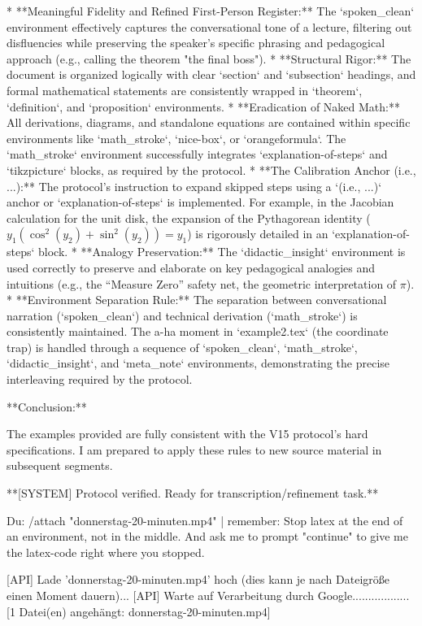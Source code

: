 *   **Meaningful Fidelity and Refined First-Person Register:** The `spoken_clean` environment effectively captures the conversational tone of a lecture, filtering out disfluencies while preserving the speaker's specific phrasing and pedagogical approach (e.g., calling the theorem "the final boss").
*   **Structural Rigor:** The document is organized logically with clear `section` and `subsection` headings, and formal mathematical statements are consistently wrapped in `theorem`, `definition`, and `proposition` environments.
*   **Eradication of Naked Math:** All derivations, diagrams, and standalone equations are contained within specific environments like `math_stroke`, `nice-box`, or `orangeformula`. The `math_stroke` environment successfully integrates `explanation-of-steps` and `tikzpicture` blocks, as required by the protocol.
*   **The Calibration Anchor (i.e., ...):** The protocol's instruction to expand skipped steps using a `(i.e., ...)` anchor or `explanation-of-steps` is implemented. For example, in the Jacobian calculation for the unit disk, the expansion of the Pythagorean identity ($y_1(\cos^2(y_2) + \sin^2(y_2)) = y_1$) is rigorously detailed in an `explanation-of-steps` block.
*   **Analogy Preservation:** The `didactic_insight` environment is used correctly to preserve and elaborate on key pedagogical analogies and intuitions (e.g., the ``Measure Zero'' safety net, the geometric interpretation of $\pi$).
*   **Environment Separation Rule:** The separation between conversational narration (`spoken_clean`) and technical derivation (`math_stroke`) is consistently maintained. The a-ha moment in `example2.tex` (the coordinate trap) is handled through a sequence of `spoken_clean`, `math_stroke`, `didactic_insight`, and `meta_note` environments, demonstrating the precise interleaving required by the protocol.

**Conclusion:**

The examples provided are fully consistent with the V15 protocol's hard specifications. I am prepared to apply these rules to new source material in subsequent segments.

**[SYSTEM] Protocol verified. Ready for transcription/refinement task.**

Du:
/attach "donnerstag-20-minuten.mp4" | remember: Stop latex at the end of an environment, not in the middle. And ask me to prompt "continue" to give me the latex-code right where you stopped.

  [API] Lade 'donnerstag-20-minuten.mp4' hoch (dies kann je nach Dateigröße einen Moment dauern)...
  [API] Warte auf Verarbeitung durch Google..................
[1 Datei(en) angehängt: donnerstag-20-minuten.mp4]

